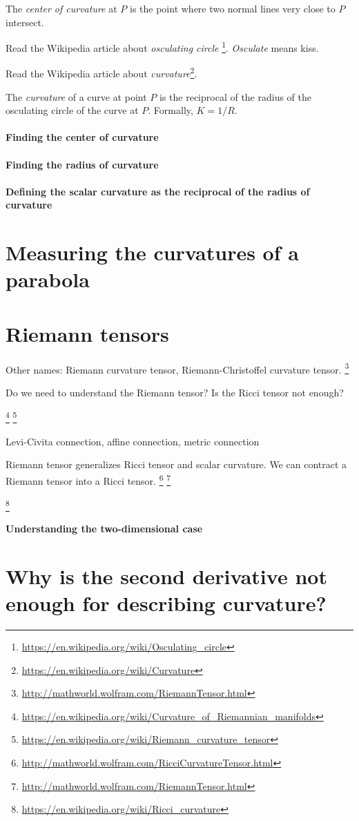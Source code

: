 The \emph{center of curvature} at \(P\) is the point where two normal lines very close to \(P\) intersect.

Read the Wikipedia article about \emph{osculating circle}%
\footnote{\url{https://en.wikipedia.org/wiki/Osculating_circle}}.
\emph{Osculate} means kiss.

Read the Wikipedia article about \emph{curvature}\footnote{\url{https://en.wikipedia.org/wiki/Curvature}}.

The \emph{curvature} of a curve at point \(P\) is the reciprocal of the radius of the osculating circle of the curve at \(P\).
Formally, \( K = 1/R \).

\paragraph{Finding the center of curvature}

\paragraph{Finding the radius of curvature}

\paragraph{Defining the scalar curvature as the reciprocal of the radius of curvature}

\section{Measuring the curvatures of a parabola}

\section{Riemann tensors}

Other names: Riemann curvature tensor,
Riemann-Christoffel curvature tensor.%
\footnote{\url{http://mathworld.wolfram.com/RiemannTensor.html}}

Do we need to understand the Riemann tensor?
Is the Ricci tensor not enough?

\footnote{\url{https://en.wikipedia.org/wiki/Curvature_of_Riemannian_manifolds}}
\footnote{\url{https://en.wikipedia.org/wiki/Riemann_curvature_tensor}}

Levi-Civita connection, affine connection, metric connection

Riemann tensor generalizes Ricci tensor and scalar curvature.
We can contract a Riemann tensor into a Ricci tensor.%
\footnote{\url{http://mathworld.wolfram.com/RicciCurvatureTensor.html}}%
\footnote{\url{http://mathworld.wolfram.com/RiemannTensor.html}}

\footnote{\url{https://en.wikipedia.org/wiki/Ricci_curvature}}

\paragraph{Understanding the two-dimensional case}

\section{Why is the second derivative not enough for describing curvature?}
